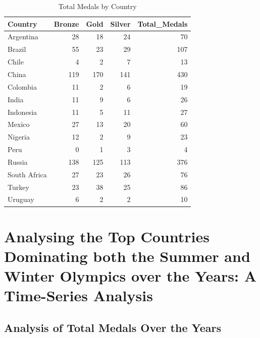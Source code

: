 \documentclass[12pt,preprint, authoryear]{elsarticle}
\numberwithin{equation}{section}
\numberwithin{figure}{section}
\numberwithin{table}{section}
\begin{document}
\begingroup\fontsize{11pt}{12pt}\selectfont
\begin{longtable}{lrrrr}
\caption{Total Medals by Country \label{tab:total_medals}} \\ 
  \toprule
Country & Bronze & Gold & Silver & Total\_Medals \\ 
  \midrule
Argentina &  28 &  18 &  24 &  70 \\ 
  Brazil &  55 &  23 &  29 & 107 \\ 
  Chile &   4 &   2 &   7 &  13 \\ 
  China & 119 & 170 & 141 & 430 \\ 
  Colombia &  11 &   2 &   6 &  19 \\ 
  India &  11 &   9 &   6 &  26 \\ 
  Indonesia &  11 &   5 &  11 &  27 \\ 
  Mexico &  27 &  13 &  20 &  60 \\ 
  Nigeria &  12 &   2 &   9 &  23 \\ 
  Peru &   0 &   1 &   3 &   4 \\ 
  Russia & 138 & 125 & 113 & 376 \\ 
  South Africa &  27 &  23 &  26 &  76 \\ 
  Turkey &  23 &  38 &  25 &  86 \\ 
  Uruguay &   6 &   2 &   2 &  10 \\ 
   \bottomrule
\end{longtable}
\endgroup

\hypertarget{analysing-the-top-countries-dominating-both-the-summer-and-winter-olympics-over-the-years-a-time-series-analysis}{%
\section{Analysing the Top Countries Dominating both the Summer and
Winter Olympics over the Years: A Time-Series
Analysis}\label{analysing-the-top-countries-dominating-both-the-summer-and-winter-olympics-over-the-years-a-time-series-analysis}}

\hypertarget{analysis-of-total-medals-over-the-years}{%
\subsection{Analysis of Total Medals Over the
Years}\label{analysis-of-total-medals-over-the-years}}
\end{document}
